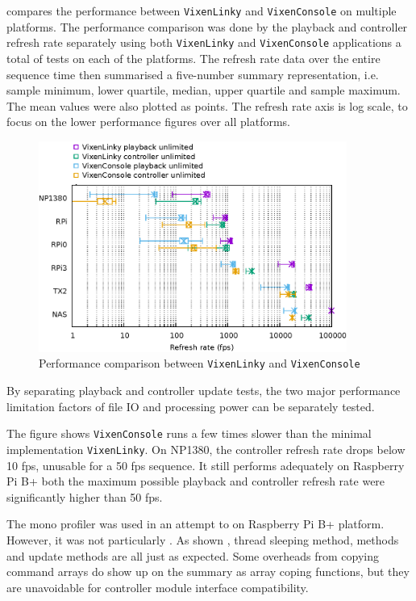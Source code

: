  compares the performance between \texttt{VixenLinky} and \texttt{VixenConsole} on multiple platforms. The performance comparison was done by  the playback and controller refresh rate separately using both \texttt{VixenLinky} and \texttt{VixenConsole} applications\ca{;} a total of  tests on each of the platforms. The refresh rate data over the entire sequence time  then summarised  a five-number summary representation, i.e. sample minimum, lower quartile, median, upper quartile and sample maximum. The mean values were also plotted as points. The refresh rate axis is log scale, to focus on the lower performance figures over all platforms.

\begin{figure}[t]
  \centering
  \includegraphics[width=0.9\textwidth]{Figs/raw-seq-p-c.eps}
  \caption{\footnotesize Performance comparison between \texttt{VixenLinky} and \texttt{VixenConsole}}
  \label{fig:raw-seq-p-c}
\end{figure}

By separating playback and controller update tests, the two major performance limitation factors of file IO and processing power can be separately tested.

The figure shows  \texttt{VixenConsole} runs a few times slower than the minimal implementation \texttt{VixenLinky}. On NP1380, the controller refresh rate drops below 10 fps, unusable for a 50 fps sequence. It still performs adequately on Raspberry Pi B+\ca{;} both the maximum possible playback and controller refresh rate were significantly higher than 50 fps.

The mono profiler was used in an attempt to  on Raspberry Pi B+ platform. However, it was not particularly . As shown  ,  thread sleeping method,  methods and update methods are all  just as expected. Some overheads from copying command arrays do show up on the summary as array coping functions, but they are  unavoidable for controller module interface compatibility.

